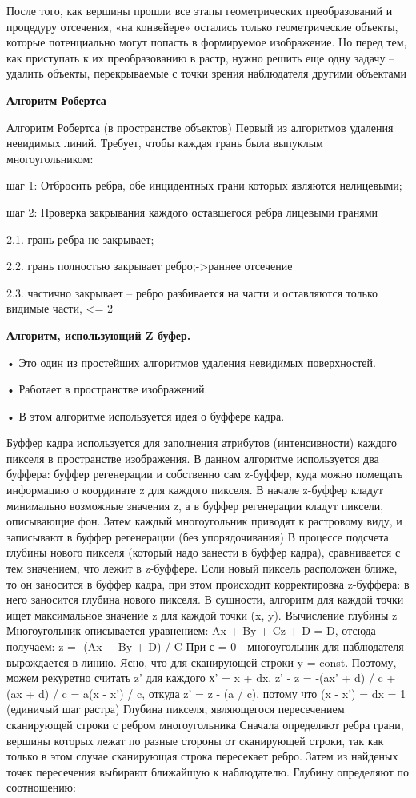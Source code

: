 После того, как вершины прошли все этапы геометрических преобразований и процедуру
отсечения, «на конвейере» остались только геометрические объекты, которые потенциально могут
попасть в формируемое изображение. Но перед тем, как приступать к их преобразованию в растр,
нужно решить еще одну задачу – удалить объекты, перекрываемые с точки зрения наблюдателя
другими объектами 

\textbf{Алгоритм Робертса}

Алгоритм Робертса (в пространстве объектов)
Первый из алгоритмов удаления невидимых линий. Требует,
чтобы каждая грань была выпуклым многоугольником:

шаг 1: Отбросить ребра, обе инцидентных грани которых
являются нелицевыми;

шаг 2: Проверка закрывания каждого оставшегося ребра
лицевыми гранями

2.1. грань ребра не закрывает;

2.2. грань полностью закрывает ребро;->раннее отсечение

2.3. частично закрывает – ребро разбивается на части и
оставляются только видимые части, <= 2 

\textbf{Алгоритм, использующий Z буфер.}

    • Это один из простейших алгоритмов удаления невидимых поверхностей.
    
    • Работает в пространстве изображений.
    
    • В этом алгоритме используется идея о буффере кадра.
    
Буффер кадра используется для заполнения атрибутов (интенсивности) каждого пикселя в пространстве изображения.
 В данном алгоритме используется два буффера: буффер регенерации и собственно сам z-буффер, куда можно помещать информацию о координате z для каждого пикселя.
В начале z-буффер кладут минимально возможные значения z, а в буффер регенерации кладут пиксели, описывающие фон.
 Затем каждый многоугольник приводят к растровому виду, и записывают в буффер регенерации (без упорядочивания)
В процессе подсчета глубины нового пикселя (который надо занести в буффер кадра), сравнивается с тем значением, что лежит в z-буффере. Если новый пиксель расположен ближе, то он заносится в буффер кадра, при этом происходит корректировка z-буффера: в него заносится глубина нового пикселя. В сущности, алгоритм для каждой точки ищет максимальное значение z для каждой точки (x, y).
Вычисление глубины z
Многоугольник описывается уравнением: Ax + By + Cz + D = D, отсюда получаем:
 z = -(Ax + By + D) / C При с = 0 - многоугольник для наблюдателя вырождается в линию.
 Ясно, что для сканирующей строки y = const. Поэтому, можем рекуретно считать z' для каждого х' = x + dx.
z' - z = -(ax' + d) / c + (ax + d) / c = a(x - x') / c, откуда z' = z - (a / c), потому что (x - x') = dx = 1 (единичый шаг растра)
Глубина пикселя, являющегося пересечением сканирующей строки с ребром многоугольника
Сначала определяют ребра грани, вершины которых лежат по разные стороны от сканирующей строки, так как только в этом случае сканирующая строка пересекает ребро. Затем из найденых точек пересечения выбирают ближайшую к наблюдателю.
Глубину определяют по соотношению:

